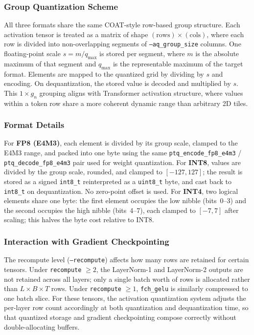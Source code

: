 \documentclass{article}
\begin{document}
\subsubsection{Group Quantization Scheme}

All three formats share the same COAT-style row-based group structure. Each activation
tensor is treated as a matrix of shape $(\text{rows}) \times (\text{cols})$, where each
row is divided into non-overlapping segments of \texttt{--aq\_group\_size} columns. One
floating-point scale $s = m / q_{\max}$ is stored per segment, where $m$ is the absolute
maximum of that segment and $q_{\max}$ is the representable maximum of the target format.
Elements are mapped to the quantized grid by dividing by $s$ and encoding. On
dequantization, the stored value is decoded and multiplied by $s$. This $1 \times
g_n$ grouping aligns with Transformer activation structure, where values within a token
row share a more coherent dynamic range than arbitrary 2D tiles.


\subsubsection{Format Details}

For \textbf{FP8 (E4M3)}, each element is divided by its group scale, clamped to the E4M3
range, and packed into one byte using the same \texttt{ptq\_encode\_fp8\_e4m3} /
\texttt{ptq\_decode\_fp8\_e4m3} pair used for weight quantization. For \textbf{INT8},
values are divided by the group scale, rounded, and clamped to $[-127, 127]$; the result
is stored as a signed \texttt{int8\_t} reinterpreted as a \texttt{uint8\_t} byte, and cast
back to \texttt{int8\_t} on dequantization. No zero-point offset is used. For \textbf{INT4},
two logical elements share one byte: the first element occupies the low nibble (bits~0--3)
and the second occupies the high nibble (bits~4--7), each clamped to $[-7, 7]$ after
scaling; this halves the byte cost relative to INT8.

\subsubsection{Interaction with Gradient Checkpointing}

The recompute level (\texttt{--recompute}) affects how many rows are retained for certain tensors. Under \texttt{recompute} $\geq 2$, the LayerNorm-1 and LayerNorm-2 outputs are not retained across all layers; only a single batch worth of rows is allocated rather than $L \times B \times T$ rows. Under \texttt{recompute} $\geq 1$, \texttt{fch\_gelu} is similarly compressed to one batch slice. For these tensors, the activation quantization system adjusts the per-layer row count accordingly at both quantization and dequantization time, so that quantized storage and gradient checkpointing compose correctly without double-allocating buffers.
\end{document}

